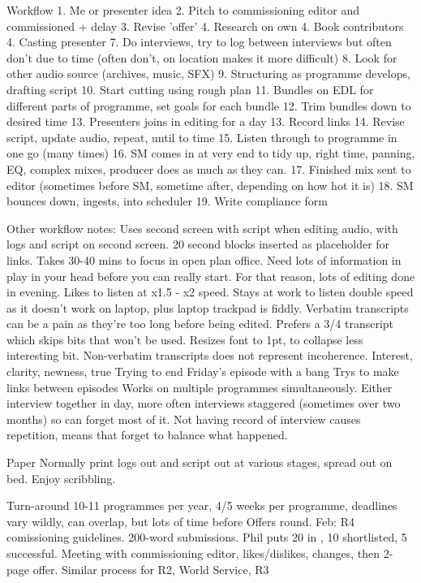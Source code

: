 Workflow
1. Me or presenter idea
2. Pitch to commissioning editor and commissioned + delay
3. Revise 'offer'
4. Research on own
4. Book contributors
4. Casting presenter
7.  Do interviews, try to log between interviews but often don't due to time
(often don't, on location makes it more difficult)
8. Look for other audio source (archives, music, SFX)
9. Structuring as programme develops, drafting script
10. Start cutting using rough plan
11. Bundles on EDL for different parts of programme, set goals for each bundle
12. Trim bundles down to desired time
13. Presenters joins in editing for a day
13. Record links
14. Revise script, update audio, repeat, until to time
15. Listen through to programme in one go (many times)
16. SM comes in at very end to tidy up, right time, panning, EQ, complex mixes,
producer does as much as they can.
17. Finished mix sent to editor (sometimes before SM, sometime after, depending
on how hot it is)
18. SM bounces down, ingests, into scheduler
19. Write compliance form

Other workflow notes:
Uses second screen with script when editing audio, with logs and script on
second screen.
20 second blocks inserted as placeholder for links.
Takes 30-40 mins to focus in open plan office. Need lots of information in play
in your head before you can really start. For that reason, lots of editing done
in evening.
Likes to listen at x1.5 - x2 speed. Stays at work to listen double speed as it
doesn't work on laptop, plus laptop trackpad is fiddly.
Verbatim transcripts can be a pain as they're too long before being edited.
Prefers a 3/4 transcript which skips bits that won't be used. Resizes font to
1pt, to collapse less interesting bit. Non-verbatim transcripts does not
represent incoherence.
Interest, clarity, newness, true
Trying to end Friday's episode with a bang
Trys to make links between episodes
Works on multiple programmes simultaneously.
Either interview together in day, more often interviews staggered (sometimes
over two months) so can forget most of it. Not having record of interview
causes repetition, means that forget to balance what happened.

Paper
Normally print logs out and script out at various stages, spread out on bed.
Enjoy scribbling.

Turn-around
10-11 programmes per year, 4/5 weeks per programme, deadlines vary wildly, can
overlap, but lots of time before
Offers round. Feb: R4 comissioning guidelines. 200-word submissions. Phil puts
20 in , 10 shortlisted, 5 successful.
Meeting with commissioning editor, likes/dislikes, changes, then 2-page offer.
Similar process for R2, World Service, R3

